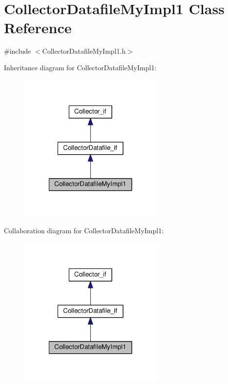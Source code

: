 \hypertarget{class_collector_datafile_my_impl1}{\section{Collector\-Datafile\-My\-Impl1 Class Reference}
\label{class_collector_datafile_my_impl1}
}


{\ttfamily \#include $<$Collector\-Datafile\-My\-Impl1.\-h$>$}



Inheritance diagram for Collector\-Datafile\-My\-Impl1\-:\nopagebreak
\begin{figure}[H]
\begin{center}
\leavevmode
\includegraphics[width=206pt]{class_collector_datafile_my_impl1__inherit__graph}
\end{center}
\end{figure}


Collaboration diagram for Collector\-Datafile\-My\-Impl1\-:\nopagebreak
\begin{figure}[H]
\begin{center}
\leavevmode
\includegraphics[width=206pt]{class_collector_datafile_my_impl1__coll__graph}
\end{center}
\end{figure}

